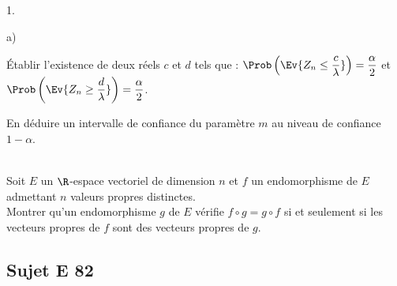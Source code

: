 \documentclass[11pt]{article}
\begin{document}
\begin{exerciceAP}
\begin{noliste}{1.}
\begin{noliste}{a)}
    \item Établir l'existence de deux réels $c$ et $d$ tels que : 
    $\Prob\left(\Ev{ Z_n \leq \dfrac{c}{\lambda}}\right) = 
    \dfrac{\alpha}{2}$ et $\Prob\left(\Ev{ Z_n \geq 
    \dfrac{d}{\lambda}}\right)=\dfrac{\alpha}{2}$.
    
    \item En déduire un intervalle de confiance du paramètre $m$ au 
    niveau de confiance $1-\alpha$.
  \end{noliste}
\end{noliste}
\end{exerciceAP}



\begin{exerciceSP}~\\
Soit $E$ un $\R$-espace vectoriel de dimension $n$ et $f$ un 
endomorphisme de $E$ admettant $n$ valeurs propres distinctes.\\
Montrer qu'un endomorphisme $g$ de $E$ vérifie $f\circ g = g\circ f$ si 
et seulement si les vecteurs propres de $f$ sont des vecteurs propres 
de $g$.
\end{exerciceSP}






\subsection*{Sujet E 82}

\end{document}
